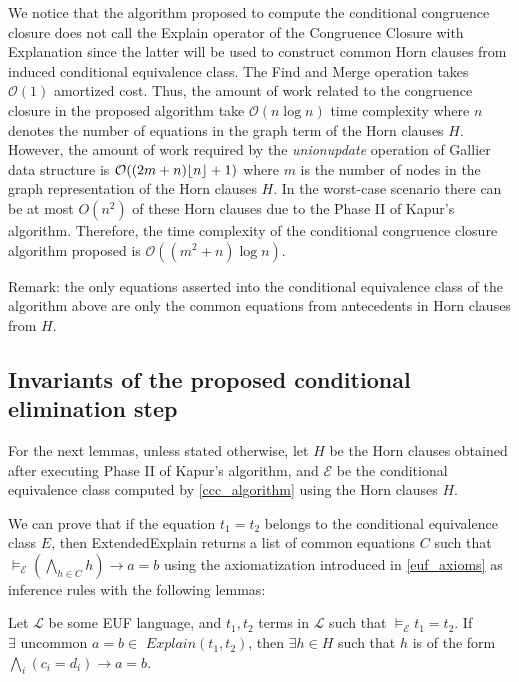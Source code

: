 We notice that the algorithm proposed to compute the 
conditional congruence closure does not call the Explain
operator of the Congruence Closure with Explanation since
the latter will be used to construct common Horn clauses
from induced conditional equivalence class. The Find and Merge
operation takes $\mathcal{O}(1)$ amortized cost. Thus, 
the amount of work related to the congruence closure
in the proposed algorithm take $\mathcal{O}(n \log n)$ time complexity
where $n$ denotes the number of equations in the graph term 
of the Horn clauses $H$.
However, the amount of work required by the \emph{unionupdate}
operation of Gallier data structure is $\mathcal{O}(
(2 m + n)\lfloor n \rfloor + 1)$ where $m$ is the number of nodes 
in the graph representation of the Horn clauses $H$. In 
the worst-case scenario there can be at most $O(n^2)$
of these Horn clauses due to the Phase II of Kapur's algorithm.
Therefore, the time complexity of the conditional
congruence closure algorithm proposed is
$\mathcal{O}((m^2 + n)\log n)$.


Remark: the only equations asserted into the 
conditional equivalence class of the algorithm
above are only the common equations from 
antecedents in Horn clauses from $H$.

\subsection{Invariants of the proposed
conditional elimination step}

For the next lemmas, unless stated otherwise, let
$H$ be the Horn clauses obtained
after executing Phase II of Kapur's algorithm, and
$\mathcal{E}$ be the conditional equivalence class
computed by \ref{ccc_algorithm} using the Horn clauses
$H$.

We can prove that if the equation $t_1 = t_2$ belongs
to the conditional equivalence class $E$, 
then ExtendedExplain returns
a list of common equations $C$ such that
$\models_{\mathcal{E}} (\bigwedge_{h \in C} h) \rightarrow a = b$
using the axiomatization introduced in \ref{euf_axioms} as 
inference rules with the following lemmas:

\begin{lemma} \label{existence_horn_in_explain}
  Let $\mathcal{L}$ be some EUF language, 
  and $t_1, t_2$ terms in 
  $\mathcal{L}$ such that
  $\models_{\mathcal{E}} t_1 = t_2$.
  If $\exists \text{ uncommon } a = b \in$
  $Explain(t_1, t_2)$, then $\exists h \in H$ such 
  that $h$ is of the form 
  $\bigwedge_i (c_i = d_i) \rightarrow a = b$.
\end{lemma}

